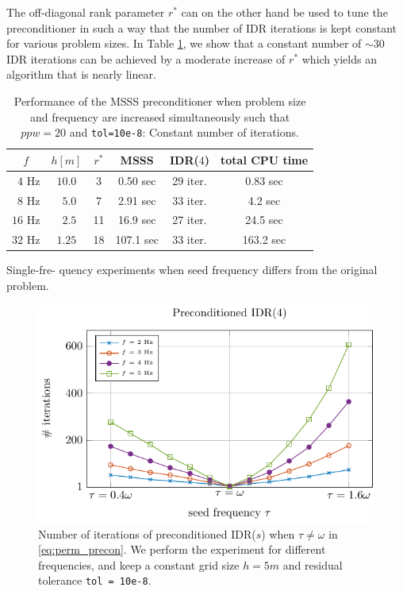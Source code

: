 The off-diagonal rank parameter $r^\ast$ can on the other hand be used to tune the preconditioner in such a way that the number of IDR iterations is kept constant for various problem sizes. In Table \ref{tab_freq_indep2}, we show that a constant number of $\sim 30$ IDR iterations can be achieved by a moderate increase of $r^\ast$ which yields an algorithm that is nearly linear.
\begin{table}[ht]
\centering
 \caption{Performance of the MSSS preconditioner when problem size and frequency are increased simultaneously such that $ppw = 20$ and \texttt{tol=10e-8}: Constant number of iterations.} \label{tab_freq_indep2}
 \begin{tabular}{|c|c|c|c|c|c|}
 \hline
  $f$ & $h [m]$ & $r^\ast$ & MSSS & IDR($4$) & total CPU time\\
  \hline
  $\phantom{0}4$ Hz & $10.0$& \phantom{0}3 & \phantom{0}0.50 sec & 29 iter.& \phantom{0}0.83 sec\\
  $\phantom{0}8$ Hz & $\phantom{0}5.0$& \phantom{0}7 &  \phantom{0}2.91 sec & 33 iter.& \phantom{00}4.2 sec \\
  $16$ Hz & $\phantom{0}2.5$& 11 & \phantom{0}16.9 sec& 27 iter.& \phantom{0}24.5 sec\\
  $32$ Hz & $1.25$& 18& 107.1 sec & 33 iter. & 163.2 sec\\
  \hline
 \end{tabular}
\end{table}

\begin{exper} \label{exp:freq2}
Single-fre- quency experiments when seed frequency differs from the original problem. 
\end{exper}

\begin{figure}[H]
  \includegraphics[width=\columnwidth]{iter_vs_tau_new.pdf}  
\caption{Number of iterations of preconditioned IDR($s$) when $\tau \neq \omega$ in \eqref{eq:perm_precon}. We perform the experiment for different frequencies, and keep a constant grid size $h=5m$ and residual tolerance \texttt{tol = 10e-8}.}
\label{fig:iter_vs_tau}
\end{figure}

